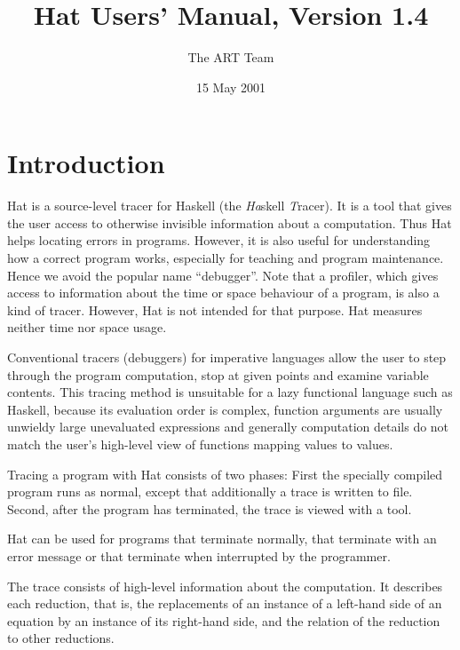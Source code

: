 \documentclass[12pt]{article}
\begin{document}
\title{Hat Users' Manual, Version 1.4}
\author{The ART Team}
\date{15 May 2001}
\maketitle
\vspace{-8ex}

\thispagestyle{empty}

\tableofcontents


\newpage
\section{Introduction}\label{introduction}

Hat is a source-level tracer for Haskell (the \emph{Ha}skell \emph{T}racer). It is a tool that gives the user access to otherwise invisible information about a computation. Thus Hat helps locating errors in programs. However, it is also useful for understanding how a correct program works, especially for teaching and program maintenance. Hence we avoid the popular name ``debugger''. Note that a profiler, which gives access to information about the time or space behaviour of a program, is also a kind of tracer. However, Hat is not intended for that purpose. Hat measures neither time nor space usage.

Conventional tracers (debuggers) for imperative languages allow the user to step through the program computation, stop at given points and examine variable contents.
This tracing method is unsuitable for a lazy functional language such as Haskell, because its evaluation order is complex, function arguments are usually unwieldy large unevaluated expressions and generally computation details do not match the user's high-level view of functions mapping values to values.

Tracing a program with Hat consists of two phases: First the specially compiled program runs as normal, except that additionally a trace is written to file. Second, after the program has terminated, the trace is viewed with a tool. 

Hat can be used for programs that terminate normally, that terminate with an error message or that terminate when interrupted by the programmer.

 The trace consists of high-level information about the computation. It describes each reduction, that is, the replacements of an instance of a left-hand side of an equation by an instance of its right-hand side, and the relation of the reduction to other reductions.
\end{document}
